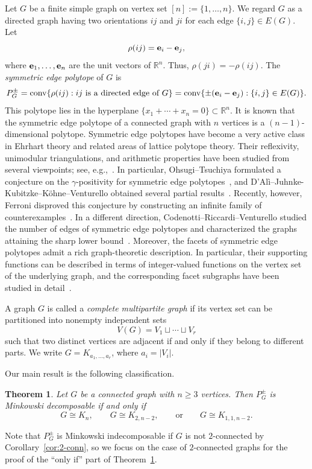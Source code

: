 \documentclass[11pt,a4paper]{amsart}
\newtheorem{theorem}{Theorem}[section]
\theoremstyle{definition}
\theoremstyle{remark}
\newcommand{\RR}{\mathbb R}
\newcommand{\conv}{\operatorname{conv}}
\newcommand{\eb}{{\bf e}}
\begin{document}
{Let $G$ be a finite simple graph on vertex set $[n]:=\{1,\ldots,n\}$. 
We regard $G$ as a directed graph having two orientations $ij$ and $ji$ for each edge $\{i,j\} \in E(G)$. 
Let \[  \rho(ij)=\eb_i-\eb_j, \]
where $\eb_1,\ldots,\eb_n$ are the unit vectors of $\RR^n$. 
Thus, $\rho(ji)=-\rho(ij)$.  The \emph{symmetric edge polytope} of $G$ is
\[  P_G^{\pm}=\conv\{\rho(ij): ij \text{ is a directed edge of }G\}  =\conv\{\pm(\eb_i-\eb_j):\{i,j\}\in E(G)\}.\]
This polytope lies in the hyperplane $\{x_1+\cdots+x_n=0\} \subset \RR^n$. 
It is known that the symmetric edge polytope of a connected graph with $n$ vertices is a  $(n-1)$-dimensional polytope.
Symmetric edge polytopes have become a very active class in Ehrhart theory and related areas of lattice polytope theory. 
Their reflexivity, unimodular triangulations, and arithmetic properties have been studied from several viewpoints; see, e.g.,~\cite{HJM,OT,DJKV}. 
In particular, Ohsugi--Tsuchiya formulated a conjecture on the $\gamma$-positivity for symmetric edge polytopes~\cite{OT}, 
and D'Al{\`i}--Juhnke-Kubitzke--K{\"o}hne--Venturello obtained several partial results~\cite{DJKV}. 
Recently, however, Ferroni disproved this conjecture by constructing an infinite family of counterexamples~\cite{F}. 
In a different direction, Codenotti--Riccardi--Venturello studied the number of edges of symmetric edge polytopes 
and characterized the graphs attaining the sharp lower bound~\cite{CRV}. 
Moreover, the facets of symmetric edge polytopes admit a rich graph-theoretic description. 
In particular, their supporting functions can be described in terms of integer-valued functions on the vertex set of the underlying graph, 
and the corresponding facet subgraphs have been studied in detail~\cite{HJM,CDK}. 

A graph $G$ is called a \emph{complete multipartite graph} if its vertex set can be partitioned into nonempty independent sets 
\[ V(G)=V_1\sqcup\cdots\sqcup V_r \]
such that two distinct vertices are adjacent if and only if they belong to different parts. We write $G=K_{a_1,\ldots,a_r}$, where $a_i=|V_i|$. 

Our main result is the following classification.
\begin{theorem}\label{thm:main}
Let $G$ be a connected graph with $n\ge 3$ vertices. Then $P_G^{\pm}$ is Minkowski decomposable if and only if 
\[G\cong K_n,\qquad G\cong K_{2,n-2},\qquad\text{or}\qquad G\cong K_{1,1,n-2}.\]
\end{theorem}
Note that $P_G^\pm$ is Minkowski indecomposable if $G$ is not $2$-connected by Corollary~\ref{cor:2-conn}, 
so we focus on the case of $2$-connected graphs for the proof of the ``only if'' part of Theorem~\ref{thm:main}. 


}
\end{document}
